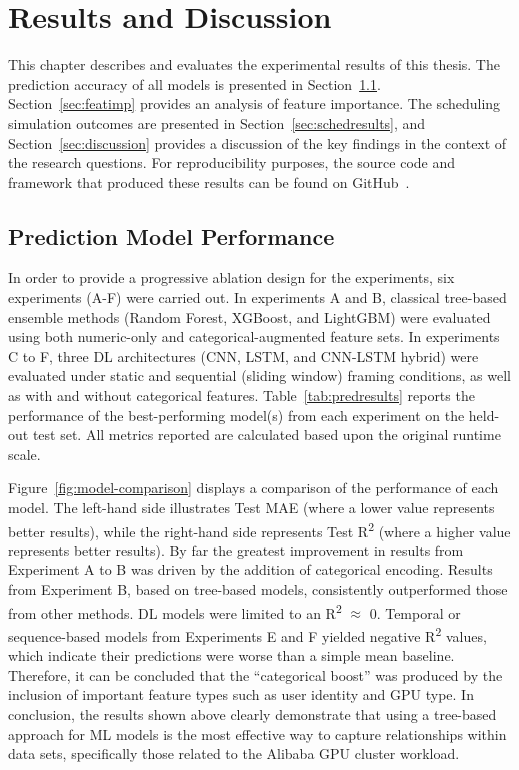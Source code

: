\chapter{Results and Discussion}\label{chp:results}

This chapter describes and evaluates the experimental results of this thesis. The prediction accuracy of all models is presented in Section~\ref{sec:predresults}. Section~\ref{sec:featimp} provides an analysis of feature importance. The scheduling simulation outcomes are presented in Section~\ref{sec:schedresults}, and Section~\ref{sec:discussion} provides a discussion of the key findings in the context of the research questions. For reproducibility purposes, the source code and framework that produced these results can be found on GitHub~\cite{celebi_github}.

\section{Prediction Model Performance}
\label{sec:predresults}

In order to provide a progressive ablation design for the experiments, six experiments (A-F) were carried out. In experiments A and B, classical tree-based ensemble methods (Random Forest, XGBoost, and LightGBM) were evaluated using both numeric-only and categorical-augmented feature sets. In experiments C to F, three DL architectures (CNN, LSTM, and CNN-LSTM hybrid) were evaluated under static and sequential (sliding window) framing conditions, as well as with and without categorical features. Table~\ref{tab:predresults} reports the performance of the best-performing model(s) from each experiment on the held-out test set. All metrics reported are calculated based upon the original runtime scale.

Figure~\ref{fig:model-comparison} displays a comparison of the performance of each model. The left-hand side illustrates Test MAE (where a lower value represents better results), while the right-hand side represents Test R\textsuperscript{2} (where a higher value represents better results). By far the greatest improvement in results from Experiment A to B was driven by the addition of categorical encoding. Results from Experiment B, based on tree-based models, consistently outperformed those from other methods. DL models were limited to an R\textsuperscript{2} $\approx$ 0. Temporal or sequence-based models from Experiments E and F yielded negative R\textsuperscript{2} values, which indicate their predictions were worse than a simple mean baseline. Therefore, it can be concluded that the ``categorical boost'' was produced by the inclusion of important feature types such as user identity and GPU type. In conclusion, the results shown above clearly demonstrate that using a tree-based approach for ML models is the most effective way to capture relationships within data sets, specifically those related to the Alibaba GPU cluster workload.

